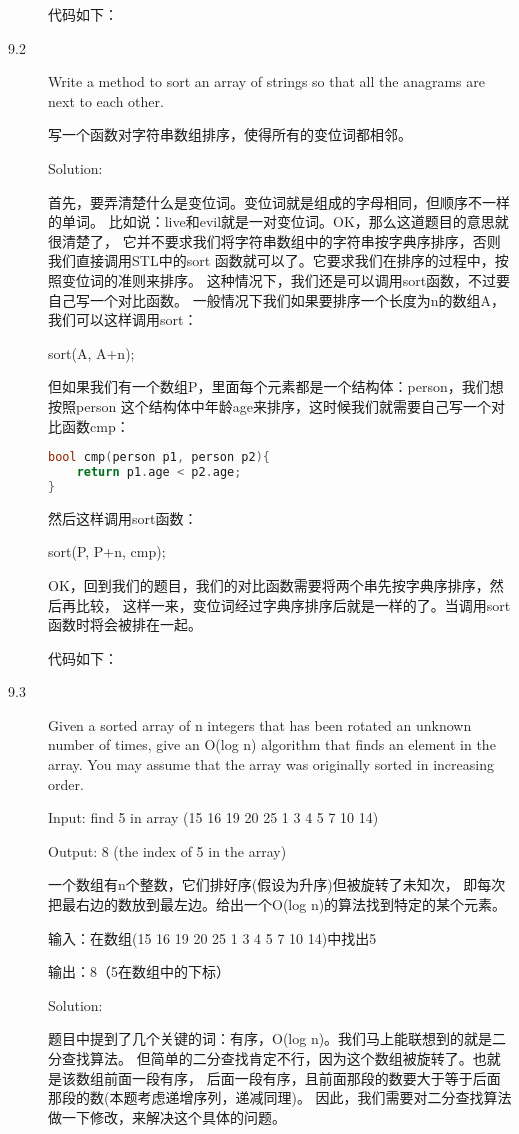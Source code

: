 \begin{description}
代码如下：



\item[9.2] Write a method to sort an array of strings so that all the anagrams are next to each other.

写一个函数对字符串数组排序，使得所有的变位词都相邻。

Solution: 

首先，要弄清楚什么是变位词。变位词就是组成的字母相同，但顺序不一样的单词。 比如说：live和evil就是一对变位词。OK，那么这道题目的意思就很清楚了， 它并不要求我们将字符串数组中的字符串按字典序排序，否则我们直接调用STL中的sort 函数就可以了。它要求我们在排序的过程中，按照变位词的准则来排序。 这种情况下，我们还是可以调用sort函数，不过要自己写一个对比函数。 一般情况下我们如果要排序一个长度为n的数组A，我们可以这样调用sort：

sort(A, A+n);

但如果我们有一个数组P，里面每个元素都是一个结构体：person，我们想按照person 这个结构体中年龄age来排序，这时候我们就需要自己写一个对比函数cmp：
\begin{lstlisting}[language=C++]
bool cmp(person p1, person p2){
    return p1.age < p2.age; 
}
\end{lstlisting}
然后这样调用sort函数：

sort(P, P+n, cmp);

OK，回到我们的题目，我们的对比函数需要将两个串先按字典序排序，然后再比较， 这样一来，变位词经过字典序排序后就是一样的了。当调用sort函数时将会被排在一起。

代码如下：



\item[9.3] Given a sorted array of n integers that has been rotated an unknown number of times, give an O(log n) algorithm that finds an element in the array. You may assume that the array was originally sorted in increasing order.

Input: find 5 in array (15 16 19 20 25 1 3 4 5 7 10 14)

Output: 8 (the index of 5 in the array)

一个数组有n个整数，它们排好序(假设为升序)但被旋转了未知次， 即每次把最右边的数放到最左边。给出一个O(log n)的算法找到特定的某个元素。

输入：在数组(15 16 19 20 25 1 3 4 5 7 10 14)中找出5

输出：8（5在数组中的下标）

Solution: 

题目中提到了几个关键的词：有序，O(log n)。我们马上能联想到的就是二分查找算法。 但简单的二分查找肯定不行，因为这个数组被旋转了。也就是该数组前面一段有序， 后面一段有序，且前面那段的数要大于等于后面那段的数(本题考虑递增序列，递减同理)。 因此，我们需要对二分查找算法做一下修改，来解决这个具体的问题。


\end{description}
